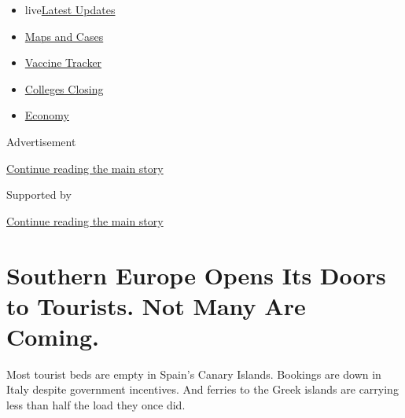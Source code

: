 \begin{itemize}
\tightlist
\item
  live\href{https://www.nytimes3xbfgragh.onion/2020/08/20/world/coronavirus-covid.html?name=styln-coronavirus-national\&region=TOP_BANNER\&variant=undefined\&block=storyline_menu_recirc\&action=click\&pgtype=Article\&impression_id=4a3791a1-e386-11ea-87bd-65e9529ada0e}{Latest
  Updates}
\item
  \href{https://www.nytimes3xbfgragh.onion/interactive/2020/us/coronavirus-us-cases.html?name=styln-coronavirus-national\&region=TOP_BANNER\&variant=undefined\&block=storyline_menu_recirc\&action=click\&pgtype=Article\&impression_id=4a3791a2-e386-11ea-87bd-65e9529ada0e}{Maps
  and Cases}
\item
  \href{https://www.nytimes3xbfgragh.onion/interactive/2020/science/coronavirus-vaccine-tracker.html?name=styln-coronavirus-national\&region=TOP_BANNER\&variant=undefined\&block=storyline_menu_recirc\&action=click\&pgtype=Article\&impression_id=4a37b8b0-e386-11ea-87bd-65e9529ada0e}{Vaccine
  Tracker}
\item
  \href{https://www.nytimes3xbfgragh.onion/2020/08/19/us/colleges-closing-covid.html?name=styln-coronavirus-national\&region=TOP_BANNER\&variant=undefined\&block=storyline_menu_recirc\&action=click\&pgtype=Article\&impression_id=4a37b8b1-e386-11ea-87bd-65e9529ada0e}{Colleges
  Closing}
\item
  \href{https://www.nytimes3xbfgragh.onion/live/2020/08/20/business/stock-market-today-coronavirus?name=styln-coronavirus-national\&region=TOP_BANNER\&variant=undefined\&block=storyline_menu_recirc\&action=click\&pgtype=Article\&impression_id=4a37b8b2-e386-11ea-87bd-65e9529ada0e}{Economy}
\end{itemize}

Advertisement

\protect\hyperlink{after-top}{Continue reading the main story}

Supported by

\protect\hyperlink{after-sponsor}{Continue reading the main story}

\hypertarget{southern-europe-opens-its-doors-to-tourists-not-many-are-coming}{%
\section{Southern Europe Opens Its Doors to Tourists. Not Many Are
Coming.}\label{southern-europe-opens-its-doors-to-tourists-not-many-are-coming}}

Most tourist beds are empty in Spain's Canary Islands. Bookings are down
in Italy despite government incentives. And ferries to the Greek islands
are carrying less than half the load they once did.


